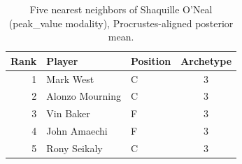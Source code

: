 \begin{table}[htbp]
  \centering\small
  \begin{tabular}{rllc}
    \toprule
    Rank & Player & Position & Archetype \\
    \midrule
    1 & Mark West & C & 3 \\
    2 & Alonzo Mourning & C & 3 \\
    3 & Vin Baker & F & 3 \\
    4 & John Amaechi & F & 3 \\
    5 & Rony Seikaly & C & 3 \\
    \bottomrule
  \end{tabular}
  \caption{Five nearest neighbors of Shaquille O'Neal (peak_value modality), Procrustes-aligned posterior mean.}
  \label{tab:Shaquille_O_Neal_neighbors_peak_value}
\end{table}

